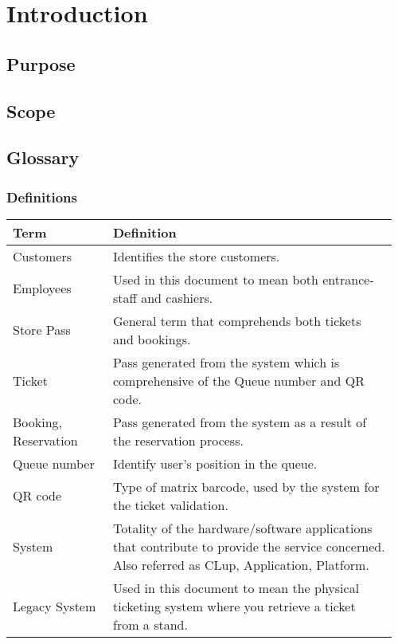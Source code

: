 \chapter{Introduction}

\section{Purpose}

\section{Scope}

\section{Glossary}
\subsection{Definitions}
\begin{center}
	\begin{tabular}{@{}p{0.25\linewidth} p{0.71\linewidth}@{}}
		\toprule
		\textbf{Term} & \textbf{Definition}\\
		\midrule
		Customers &  Identifies the store customers.\\
		Employees & Used in this document to mean both entrance-staff and cashiers.\\
		Store Pass & General term that comprehends both tickets and bookings.\\
		Ticket & Pass generated from the system which is comprehensive of the Queue number and QR code.\\
		Booking, Reservation & Pass generated from the system as a result of the reservation process.\\
		Queue number & Identify user's position in the queue.\\
		QR code & Type of matrix barcode, used by the system for the ticket validation.\\
		System & Totality of the hardware/software applications that contribute to provide the service concerned. Also referred as CLup, Application, Platform.\\
		Legacy System & Used in this document to mean the physical ticketing system where you retrieve a ticket from a stand.\\
		\bottomrule
	\end{tabular}
\end{center}

